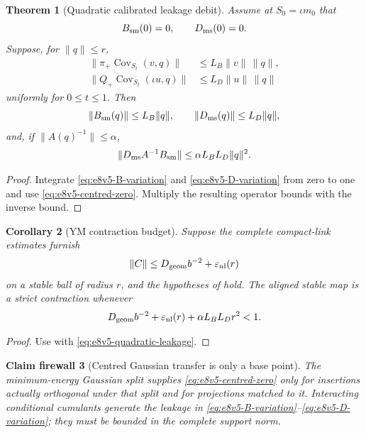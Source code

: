 \documentclass[11pt,oneside]{book}
\newtheorem{theorem}{Theorem}[chapter]
\newtheorem{corollary}[theorem]{Corollary}
\newtheorem{firewall}[theorem]{Claim firewall}
\theoremstyle{definition}
\theoremstyle{remark}
\begin{document}
\begin{theorem}[Quadratic calibrated leakage debit]
\label{thm:e8v5-quadratic-debit}
Assume at \(S_0=\iota m_0\) that
\[
 B_{\rm sm}(0)=0,\qquad D_{\rm ms}(0)=0.             \label{eq:e8v5-centred-zero}
\]
Suppose, for \(\|q\|\le r\),
\begin{align}
 \|\pi_+\operatorname{Cov}_{S_t}(v,q)\|
 &\le L_B\|v\|\,\|q\|,                              \label{eq:e8v5-covB}\\
 \|Q_+\operatorname{Cov}_{S_t}(\iota u,q)\|
 &\le L_D\|u\|\,\|q\|                               \label{eq:e8v5-covD}
\end{align}
uniformly for \(0\le t\le1\).  Then
\[
 \|B_{\rm sm}(q)\|\le L_B\|q\|,\qquad
 \|D_{\rm ms}(q)\|\le L_D\|q\|,                     \label{eq:e8v5-linear-leakage}
\]
and, if \(\|A(q)^{-1}\|\le\alpha\),
\[
 \|D_{\rm ms}A^{-1}B_{\rm sm}\|
 \le\alpha L_BL_D\|q\|^2.                           \label{eq:e8v5-quadratic-leakage}
\]
\end{theorem}

\begin{proof}
Integrate \eqref{eq:e8v5-B-variation} and
\eqref{eq:e8v5-D-variation} from zero to one and use
\eqref{eq:e8v5-centred-zero}.  Multiply the resulting operator
bounds with the inverse bound.
\end{proof}

\begin{corollary}[YM contraction budget]
\label{cor:e8v5-YM-budget}
Suppose the complete compact-link estimates furnish
\[
 \|C\|\le D_{\rm geom}b^{-2}+\varepsilon_{\rm nl}(r) \label{eq:e8v5-Cbudget}
\]
on a stable ball of radius \(r\), and the hypotheses of
 hold.  The aligned stable map is a
strict contraction whenever
\[
 D_{\rm geom}b^{-2}+\varepsilon_{\rm nl}(r)
 +\alpha L_BL_Dr^2<1.                               \label{eq:e8v5-YM-gate}
\]
\end{corollary}

\begin{proof}
Use  with
\eqref{eq:e8v5-quadratic-leakage}.
\end{proof}

\begin{firewall}[Centred Gaussian transfer is only a base point]
\label{fire:e8v5-centred}
The minimum-energy Gaussian split supplies
\eqref{eq:e8v5-centred-zero} only for insertions actually orthogonal
under that split and for projections matched to it.  Interacting
conditional cumulants generate the leakage in
\eqref{eq:e8v5-B-variation}--\eqref{eq:e8v5-D-variation}; they must be
bounded in the complete support norm.
\end{firewall}
\end{document}
